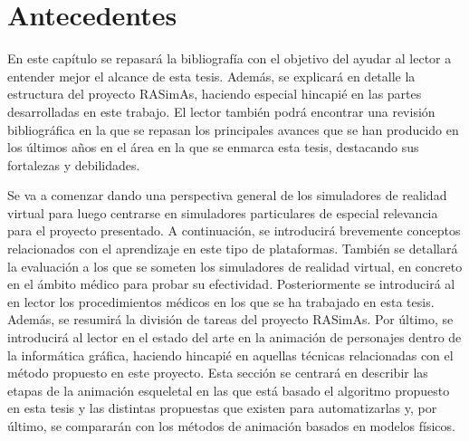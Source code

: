 \chapter{Antecedentes} 
\label{cap:related}



En este capítulo se repasará la bibliografía con el objetivo del ayudar al lector a entender mejor el alcance de esta tesis.
Además, se explicará en detalle la estructura del proyecto RASimAs, haciendo especial hincapié en las partes desarrolladas en este trabajo. El lector también podrá encontrar una revisión bibliográfica en la que se repasan los principales avances que se han producido en los últimos años en el área en la que se enmarca esta tesis, destacando sus fortalezas y debilidades. 

Se va a comenzar dando una perspectiva general de los simuladores de realidad virtual para luego centrarse en simuladores particulares de especial relevancia para el proyecto presentado. A continuación, se introducirá brevemente conceptos relacionados con el aprendizaje en este tipo de plataformas. También se detallará la evaluación a los que se someten los simuladores de realidad virtual, en concreto en el ámbito médico para probar su efectividad. Posteriormente se introducirá al en lector los procedimientos médicos en los que se ha trabajado en esta tesis. Además, se resumirá la división de tareas del proyecto \ac{RASimAs}. 
Por último, se introducirá al lector en el estado del arte  en la animación de personajes dentro de la informática gráfica, haciendo hincapié en aquellas técnicas relacionadas con el método propuesto en este proyecto. Esta sección se centrará en describir las etapas de la animación esqueletal en las que está basado el algoritmo propuesto en esta tesis y las distintas propuestas que existen para automatizarlas y, por último, se compararán con los métodos de animación basados en modelos físicos.


